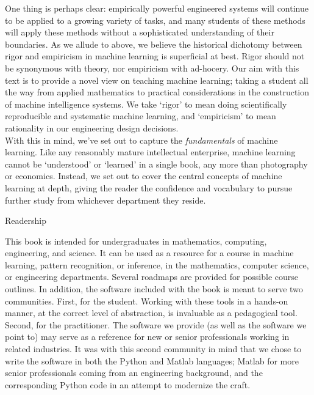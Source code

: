 \documentclass[10pt]{article}
\newenvironment{changemargin}[2]{%
\begin{list}{}{%
\setlength{\topsep}{0pt}%
\setlength{\leftmargin}{#1}%
\setlength{\rightmargin}{#2}%
\setlength{\listparindent}{\parindent}%
\setlength{\itemindent}{\parindent}%
\setlength{\parsep}{\parskip}%
}%
\item[]}{\end{list}}
\renewcommand{\it}{\textit}
\begin{document}
\begin{changemargin}{+-1cm}{-3cm}
One thing is perhaps clear: empirically powerful engineered systems will continue to be applied to a growing variety of tasks, and many students of these methods will apply these methods without a sophisticated understanding of their boundaries. As we allude to above, we believe the historical dichotomy between rigor and empiricism in machine learning is superficial at best. Rigor should not be synonymous with theory, nor empiricism with ad-hocery. Our aim with this text is to provide a novel view on teaching machine learning; taking a student all the way from applied mathematics to practical considerations in the construction of machine intelligence systems. We take `rigor' to mean doing scientifically reproducible and systematic machine learning, and `empiricism' to mean rationality in our engineering design decisions.\\

 With this in mind, we've set out to capture the \it{fundamentals} of machine learning. Like any reasonably mature intellectual enterprise, machine learning cannot be `understood' or `learned' in a single book, any more than photography or economics. Instead, we set out to cover the central concepts of machine learning at depth, giving the reader the confidence and vocabulary to pursue further study from whichever department they reside.

\vspace{1cm}
\noindent
\large{Readership}\\
\small

This book is intended for undergraduates in mathematics, computing, engineering, and science. It can be used as a resource for a course in machine learning, pattern recognition, or inference, in the mathematics, computer science, or engineering departments. Several roadmaps are provided for possible course outlines. In addition, the software included with the book is meant to serve two communities. First, for the student. Working with these tools in a hands-on manner, at the correct level of abstraction, is invaluable as a pedagogical tool. Second, for the practitioner. The software we provide (as well as the software we point to) may serve as a reference for new or senior professionals working in related industries. It was with this second community in mind that we chose to write the software in both the Python and Matlab languages; Matlab for more senior professionals coming from an engineering background, and the corresponding Python code in an attempt to modernize the craft. \\



\end{changemargin}
\end{document}
